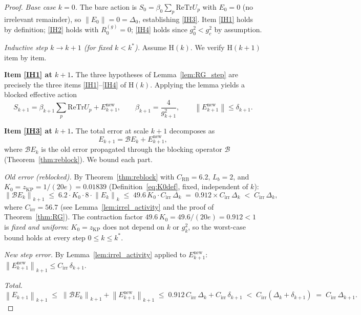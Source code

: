 \documentclass[11pt,a4paper]{amsart}
\theoremstyle{definition}
\newcommand{\re}{\mathrm{Re}}
\newcommand{\Tr}{\mathrm{Tr}}
\newcommand{\norm}[1]{\left\|#1\right\|}
\newcommand{\gB}{g^2_c}
\newcommand{\zKP}{z_{\mathrm{KP}}}
\newcommand{\CRB}{C_{\mathrm{RB}}}
\begin{document}
\begin{proof}
\textit{Base case $k=0$.}
The bare action is $S_0 = \beta_0\sum_p\re\Tr U_p$ with $E_0 = 0$
(no irrelevant remainder), so $\norm{E_0} = 0 = \Delta_0$, establishing
\ref{IH3}.  Item \ref{IH1} holds by definition; \ref{IH2} holds with
$R^{(g)}_0 = 0$; \ref{IH4} holds since $g^2_0 < \gB$ by assumption. \checkmark

\medskip
\textit{Inductive step $k \to k+1$ \textup{(}for fixed $k < k^*$\textup{)}.}
Assume $\mathrm{H}(k)$.  We verify $\mathrm{H}(k+1)$ item by item.

\smallskip\noindent
\textbf{Item \ref{IH1} at $k+1$.}
The three hypotheses of Lemma~\ref{lem:RG_step} are precisely the three
items \ref{IH1}--\ref{IH4} of $\mathrm{H}(k)$.  Applying the lemma yields
a blocked effective action
\[
  S_{k+1} = \beta_{k+1}\sum_p\re\Tr U_p + E^{\mathrm{new}}_{k+1},
  \qquad
  \beta_{k+1} = \frac{4}{g^2_{k+1}},
  \qquad
  \norm{E^{\mathrm{new}}_{k+1}} \le \delta_{k+1}.
\]
\checkmark

\smallskip\noindent
\textbf{Item \ref{IH3} at $k+1$.}
The total error at scale $k+1$ decomposes as
\[
  E_{k+1} = \mathcal{B}E_k + E^{\mathrm{new}}_{k+1},
\]
where $\mathcal{B}E_k$ is the old error propagated through the blocking
operator $\mathcal{B}$ (Theorem~\ref{thm:reblock}).  We bound each part.

\emph{Old error (reblocked).}
By Theorem~\ref{thm:reblock} with $\CRB = 6.2$, $L_b = 2$, and
$K_0 = \zKP = 1/(20e) = 0.01839$ (Definition~\eqref{eq:K0def}, fixed,
independent of $k$):
\begin{equation}
\label{eq:reblock_contract}
  \norm{\mathcal{B}E_k}_{k+1}
  \;\le\; 6.2 \cdot K_0 \cdot 8 \cdot \norm{E_k}_k
  \;\le\; 49.6\,K_0 \cdot C_{\mathrm{irr}}\,\Delta_k
  \;=\; 0.912 \times C_{\mathrm{irr}}\,\Delta_k
  \;<\; C_{\mathrm{irr}}\,\Delta_k,
\end{equation}
where $C_{\mathrm{irr}} = 56.7$ (see Lemma~\ref{lem:irrel_activity} and
the proof of Theorem~\ref{thm:RG}).
The contraction factor $49.6\,K_0 = 49.6/(20e) = 0.912 < 1$ is
\emph{fixed and uniform}: $K_0 = \zKP$ does not depend on $k$ or $g^2_k$,
so the worst-case bound holds at every step $0 \le k \le k^*$.

\emph{New step error.}
By Lemma~\ref{lem:irrel_activity} applied to $E^{\mathrm{new}}_{k+1}$:
$\norm{E^{\mathrm{new}}_{k+1}}_{k+1} \le C_{\mathrm{irr}}\,\delta_{k+1}$.

\emph{Total.}
\begin{equation}
\label{eq:H3step}
  \norm{E_{k+1}}_{k+1}
  \;\le\; \norm{\mathcal{B}E_k}_{k+1} + \norm{E^{\mathrm{new}}_{k+1}}_{k+1}
  \;\le\; 0.912\,C_{\mathrm{irr}}\,\Delta_k + C_{\mathrm{irr}}\,\delta_{k+1}
  \;<\; C_{\mathrm{irr}}(\Delta_k + \delta_{k+1})
  \;=\; C_{\mathrm{irr}}\,\Delta_{k+1}.
\end{equation}
\checkmark


\end{proof}
\end{document}
